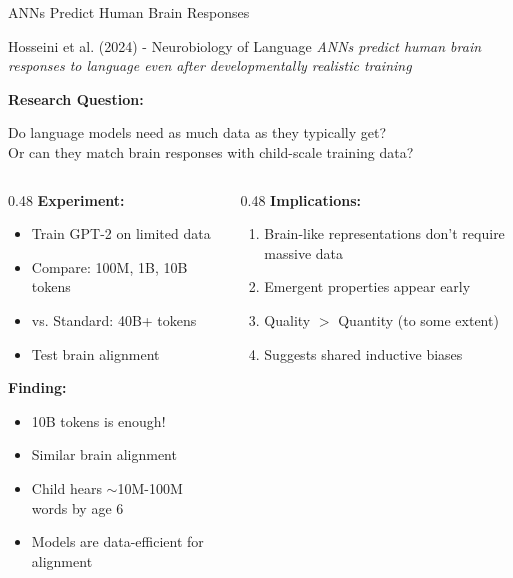 \documentclass[aspectratio=169]{beamer}
\begin{document}
\begin{frame}{ANNs Predict Human Brain Responses 👶}
\begin{block}{Hosseini et al. (2024) - Neurobiology of Language}
\textit{ANNs predict human brain responses to language even after developmentally realistic training}
\end{block}

\vspace{0.5em}

\textbf{Research Question:}
\begin{center}
Do language models need as much data as they typically get?\\
Or can they match brain responses with \alert{child-scale} training data?
\end{center}

\vspace{0.5em}

\begin{columns}[T]
\begin{column}{0.48\textwidth}
\textbf{Experiment:}
\begin{itemize}
    \item Train GPT-2 on limited data
    \item Compare: 100M, 1B, 10B tokens
    \item vs. Standard: 40B+ tokens
    \item Test brain alignment
\end{itemize}

\vspace{0.5em}

\textbf{Finding:}
\begin{itemize}
    \item \alert{10B tokens is enough!}
    \item Similar brain alignment
    \item Child hears $\sim$10M-100M words by age 6
    \item Models are data-efficient for alignment
\end{itemize}
\end{column}

\begin{column}{0.48\textwidth}
\textbf{Implications:}
\begin{enumerate}
    \item Brain-like representations don't require massive data
    \item Emergent properties appear early
    \item Quality $>$ Quantity (to some extent)
    \item Suggests shared inductive biases
\end{enumerate}


\end{column}
\end{columns}
\end{frame}
\end{document}
